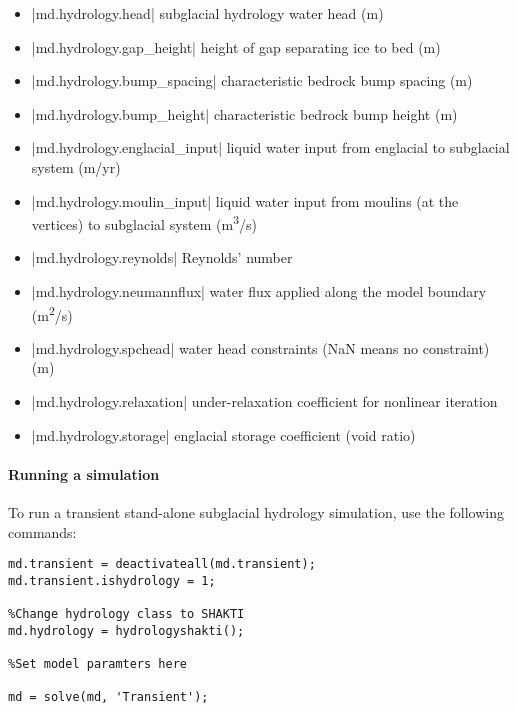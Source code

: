 \begin{itemize}
	\item \lstinlinebg|md.hydrology.head| subglacial hydrology water head (m)
	\item \lstinlinebg|md.hydrology.gap_height| height of gap separating ice to bed (m)
	\item \lstinlinebg|md.hydrology.bump_spacing| characteristic bedrock bump spacing (m)
	\item \lstinlinebg|md.hydrology.bump_height| characteristic bedrock bump height (m)
	\item \lstinlinebg|md.hydrology.englacial_input| liquid water input from englacial to subglacial system (m/yr)
	\item \lstinlinebg|md.hydrology.moulin_input| liquid water input from moulins (at the vertices) to subglacial system (m\textsuperscript{3}/s)
	\item \lstinlinebg|md.hydrology.reynolds| Reynolds' number
	\item \lstinlinebg|md.hydrology.neumannflux| water flux applied along the model boundary (m\textsuperscript{2}/s)
	\item \lstinlinebg|md.hydrology.spchead| water head constraints (NaN means no constraint) (m)
	\item \lstinlinebg|md.hydrology.relaxation| under-relaxation coefficient for nonlinear iteration
	\item \lstinlinebg|md.hydrology.storage| englacial storage coefficient (void ratio)
\end{itemize}

\paragraph{Running a simulation}
To run a transient stand-alone subglacial hydrology simulation, use the following commands:
\begin{lstlisting}
md.transient = deactivateall(md.transient);
md.transient.ishydrology = 1;

%Change hydrology class to SHAKTI
md.hydrology = hydrologyshakti();

%Set model paramters here

md = solve(md, 'Transient');
\end{lstlisting}

\clearpage %
